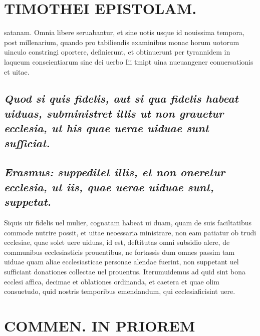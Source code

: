 \documentclass{article}
\begin{document}
\begin{pages}
\section*{TIMOTHEI EPISTOLAM. }
\marginpar{[ p.135 ]}\pstart satanam. Omnia libere seruabantur, et sine uotis usque  id nouissima tempora, post millenarium, quando pro tabiliendis examinibus monac horum uotorum uinculo constringi oportere, definierunt, et obtinuerunt per tyrannidem in laqueum conscientiarum sine dei uerbo Iii tmipt uina nueuangener conuersationis et uitae.  \pend
{}
{}
\subsection*{\textit{Quod si quis fidelis, aut si qua fidelis habeat uiduas, subministret illis ut non grauetur ecclesia, ut his quae uerae uiduae sunt sufficiat. }}
{}
\subsection*{\textit{Erasmus: suppeditet illis, et non oneretur ecclesia, ut iis, quae uerae uiduae sunt, suppetat. }}\pstart Siquis uir fidelis uel mulier, cognatam habeat ui duam, quam de suis faciltatibus commode nutrire possit, et uitae neoessaria ministrare, non eam patiatur ob trudi ecclesiae, quae solet uere uiduas, id est, deftitutas omni subsidio alere, de communibus ecclesiasticis prouentibus, ne fortassis dum omnes passim tam uiduae quam aliae ecclesiasticae personae alendae fuerint, non suppetant uel sufficiant donationes collectae uel prouentus. Iterumuidemus ad quid sint bona ecclesi affica, decimae et oblationes ordinanda, et caetera et quae olim consuetudo, quid nostris temporibus emendandum, qui ccclesiaficisint uere.  \pend
\section*{COMMEN. IN PRIOREM }
\marginpar{[ p.136 ]}
{}

\end{pages}
\end{document}
